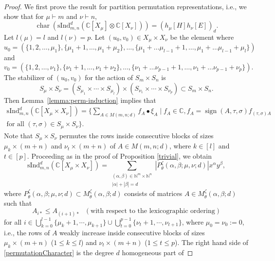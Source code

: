 \documentclass[12pt,reqno]{amsart}
\theoremstyle{definition}
\theoremstyle{remark}
\newcommand{\ind}{\mathrm{sInd}_{m,n}^{d}}
\DeclareMathOperator{\ch}{char}
\DeclareMathOperator{\sign}{sign}
\begin{document}
\begin{proof}
    We first prove the result for partition permutation representations, i.e., we show that
    for $\mu\vdash m$ and $\nu\vdash n$, 
    \begin{equation}\label{charPermutation}
        \ch(\ind(\mathbb{C}[X_{\mu}]\otimes \mathbb{C}[X_{\nu}]))=(h_{\mu}[H]h_{\nu}[E])_{d}.
    \end{equation}
Let $l(\mu)=l$ and $l(\nu)=p$. Let $(u_{0},v_{0})\in X_{\mu}\times X_{\nu}$ be the element where 
    $$u_{0}=(\{1,2,\dotsc,\mu_{1}\},\{\mu_{1}+1,\dotsc,\mu_{1}+\mu_{2}\},\dotsc,\{\mu_{1}+\dotsc\mu_{l-1}+1,\dotsc,\mu_{1}+\dotsc\mu_{l-1}+\mu_{l}\})$$ 
    and 
    $$v_{0}=(\{1,2,\dotsc,\nu_{1}\},\{\nu_{1}+1,\dotsc,\nu_{1}+\nu_{2}\},\dotsc,\{\nu_{1}+\dotsc\nu_{p-1}+1,\dotsc,\nu_{1}+\dotsc\nu_{p-1}+\nu_{p}\}).$$
The stabilizer of $(u_{0},v_{0})$ for the action of $S_{m}\times S_{n}$ is $$S_{\mu}\times S_{\nu}= (S_{\mu_{1}}\times \cdots\times S_{\mu_{l}})\times (S_{\nu_{1}}\times \cdots \times S_{\nu_{p}})\subset S_{m}\times S_{n}.$$
Then Lemma~\ref{lemma:perm-induction} implies that 
\begin{multline*}
    \ind(\mathbb{C}[X_{\mu}\times X_{\nu}])=\{\sum_{A\in M(m,n;d)}f_{A}\bullet\xi_{A}\mid f_{A}\in\mathbb{C},   f_{A}=\sign(A,\tau,\sigma )f_{(\tau,\sigma)A}\\ \text{for all }(\tau,\sigma)\in S_{\mu}\times S_{\nu}\}.
\end{multline*}
Note that $S_{\mu}\times S_{\nu}$ permutes the rows inside consecutive blocks of sizes $\mu_{k}\times (m+n)$ and $\nu_{t}\times (m+n)$ of $A\in M(m,n;d)$, where $k\in [l]$ and $t\in[p]$. Proceeding as in the proof of Proposition \ref{trivial}, we obtain
\begin{equation}\label{permutationCharacter}
    \ind(\mathbb{C}[X_{\mu}\times X_{\nu}])=\sum_{\substack{(\alpha,\beta)\in\mathbb{N}^m \times\mathbb N^n\\|\alpha|+|\beta|=d}} |P^{\zeta}_{\theta}(\alpha,\beta;\mu,\nu;d)|x^{\alpha}y^{\beta},
\end{equation}
where $P^{\zeta}_{\theta}(\alpha,\beta;\mu,\nu;d)\subset M^{\zeta}_{\theta}(\alpha,\beta;d)$ consists of matrices $A\in M^{\zeta}_{\theta}(\alpha,\beta;d)$ such that
$$A_{i*}\leq A_{(i+1)*} \text{ } (\text{with respect to the lexicographic ordering})$$ for all $i\in \bigcup_{k=0}^{l-1}\{\mu_{k}+1,\cdots,\mu_{k+1}\} \cup\bigcup_{t=0}^{p-1}\{\nu_{t}+1,\cdots,\nu_{t+1}\}$, where $\mu_{0}=\nu_{0}:=0$, i.e., the rows of $A$ weakly increase inside consecutive blocks of sizes $\mu_{k}\times (m+n)$ ($1\leq k\leq l$) and $\nu_{t}\times (m+n)$ ($1\leq t\leq p$). The right hand side of \eqref{permutationCharacter} is the degree $d$ homogeneous part of

\end{proof}
\end{document}
